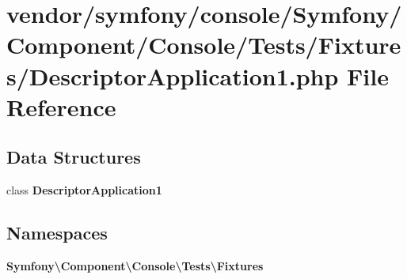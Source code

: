 \section{vendor/symfony/console/\+Symfony/\+Component/\+Console/\+Tests/\+Fixtures/\+Descriptor\+Application1.php File Reference}
\label{_descriptor_application1_8php}
\subsection*{Data Structures}
\begin{DoxyCompactItemize}
\item 
class {\bf Descriptor\+Application1}
\end{DoxyCompactItemize}
\subsection*{Namespaces}
\begin{DoxyCompactItemize}
\item 
 {\bf Symfony\textbackslash{}\+Component\textbackslash{}\+Console\textbackslash{}\+Tests\textbackslash{}\+Fixtures}
\end{DoxyCompactItemize}
